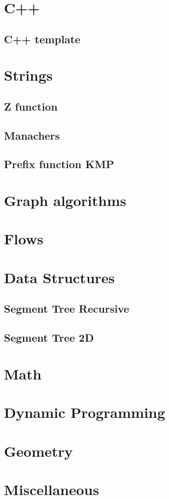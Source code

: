 \section{C++}
\subsection{C++ template}
\raggedbottom
\hrulefill

\section{Strings}
\subsection{Z function}
\raggedbottom
\hrulefill
\subsection{Manachers}
\raggedbottom
\hrulefill
\subsection{Prefix function KMP}
\raggedbottom
\hrulefill

\section{Graph algorithms}

\section{Flows}

\section{Data Structures}
\subsection{Segment Tree Recursive}
\raggedbottom
\hrulefill
\subsection{Segment Tree 2D}
\raggedbottom
\hrulefill

\section{Math}

\section{Dynamic Programming}

\section{Geometry}

\section{Miscellaneous}

